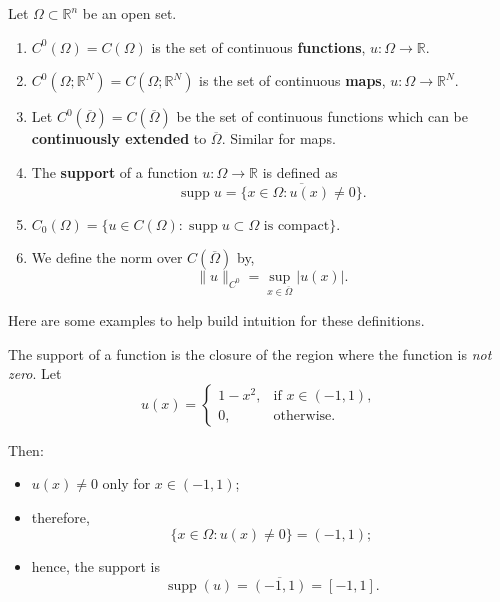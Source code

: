 \begin{definition}
    \label{def:Continuous Functions}
    Let $\Omega \subset \mathbb{R}^n$ be an open set.
    \begin{enumerate}
        \item[(ia)] $C^0(\Omega) = C(\Omega)$ is the set of continuous \textbf{functions}, $u : \Omega \rightarrow \mathbb{R}$.
        \item[(ib)] $C^0(\Omega;\mathbb{R}^N) = C(\Omega;\mathbb{R}^N)$ is the set of continuous \textbf{maps}, $u : \Omega \rightarrow \mathbb{R}^N$.
        \item [(ii)] Let $C^0(\overline{\Omega}) = C(\overline{\Omega})$ be the set of continuous functions which can be \textbf{continuously extended} to $\overline{\Omega}$. Similar for maps.
        \item[(iii)] The \textbf{support} of a function $u : \Omega \rightarrow \mathbb{R}$ is defined as 
        \[
            \operatorname{supp} u = \overline{\{x \in \Omega : u(x) \neq 0\}}.
        \]
        \item[(iv)] $C_0(\Omega) = \{u \in C(\Omega) : \operatorname{supp} u \subset \Omega \text{ is compact}\}$.
        \item[(v)] We define the norm over $C(\overline{\Omega})$ by,
        \[
        \|u\|_{C^0} = \sup_{x \in \overline{\Omega}} |u(x)|.
        \]
    \end{enumerate}
\end{definition}

Here are some examples to help build intuition for these definitions.

\begin{example}
    \label{ex:Support}

The support of a function is the closure of the region where the function
is \textit{not zero}. Let
\[
u(x) =
\begin{cases}
1-x^2, & \text{if } x\in(-1,1),\\
0, & \text{otherwise}.
\end{cases}
\]

Then:
\begin{itemize}
    \item $u(x)\neq0$ only for $x\in(-1,1)$;

    \item therefore,
    \[
        \{x\in\Omega:u(x)\neq0\}=(-1,1);
    \]

    \item hence, the support is
    \[
        \operatorname{supp}(u)
        =\overline{(-1,1)}
        =[-1,1].
    \]
\end{itemize}

\end{example}

